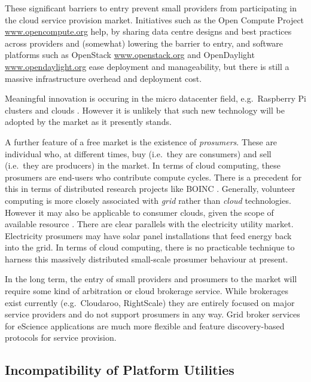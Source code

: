 \documentclass[conference,10pt]{IEEEtran}
\begin{document}
These significant barriers to entry prevent small providers from participating in the cloud service provision market. Initiatives such as the Open Compute Project \url{www.opencompute.org} help, by sharing data centre designs and best practices across providers and (somewhat) lowering the barrier to entry, and software platforms such as OpenStack \url{www.openstack.org} and OpenDaylight \url{www.opendaylight.org} ease deployment and manageability, but there is still a massive infrastructure overhead and deployment cost.

Meaningful innovation is occuring in the micro datacenter field, e.g.\ Raspberry Pi clusters \cite{cox14low} and clouds \cite{tso13glasgow,abrahamsson13affordable,valancius:2009:greening}.
However it is unlikely that such new technology will be adopted by the market as it presently stands.


A further feature of a free market is the existence of \emph{prosumers}. These are individual who, at different times,  buy (i.e.\ they are consumers) and sell (i.e.\ they are producers) in the market. In terms of cloud computing, these prosumers are end-users who contribute compute cycles. There is a precedent for this in terms of distributed research projects like BOINC \cite{anderson04boinc}.
Generally, volunteer computing is more closely associated with \emph{grid} rather than \emph{cloud} technologies. However it may also be applicable to consumer clouds, given the scope of available resource \cite{anderson06computational}. There are clear parallels with the electricity utility market. Electricity prosumers may have solar panel installations that feed energy back into the grid. In terms of cloud computing, there is no practicable technique to harness this massively distributed small-scale prosumer behaviour at present.

In the long term, the entry of small providers and prosumers to the market will require some kind of arbitration or cloud brokerage service. While brokerages exist currently (e.g.\ Cloudaroo, RightScale) they are entirely focused on major service providers and do not support prosumers in any way.
Grid broker services \cite{url4} for eScience applications are much more flexible and feature discovery-based protocols for service provision. 


\subsection{Incompatibility of Platform Utilities}
\end{document}
